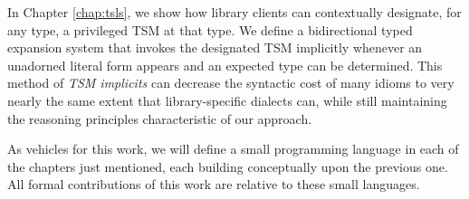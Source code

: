 In Chapter \ref{chap:tsls}, we show how library clients can contextually designate, for any type, a privileged TSM at that type. We define a bidirectional typed expansion system that  invokes the designated TSM implicitly whenever an unadorned literal form appears and an expected type can be determined. This method of \emph{TSM implicits} can decrease the syntactic cost of many idioms to very nearly the same extent that library-specific dialects can, while still maintaining the reasoning principles characteristic of our approach.


As vehicles for this work, we will define a small programming language in each of the chapters just mentioned, each building conceptually upon the previous one. All formal contributions of this work are relative to these small languages.


